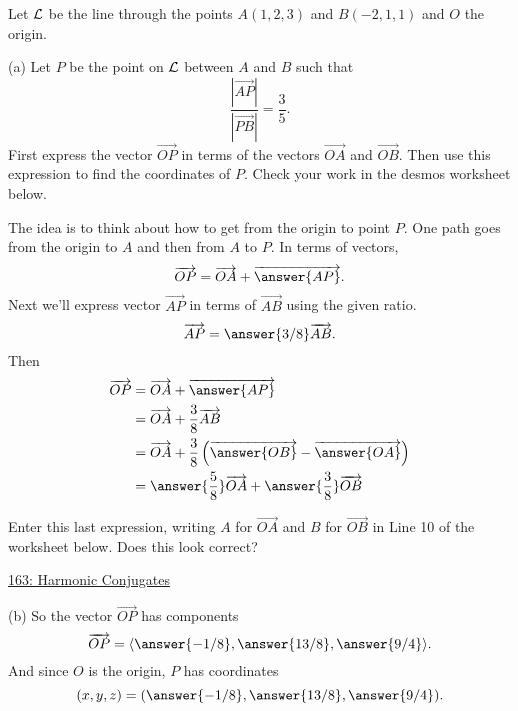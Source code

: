 \documentclass{ximera}
\begin{document}
\begin{question} \label{Q98344422}
Let ${\cal L}$ be the line through the points $A(1,2,3)$ and $B(-2,1,1)$ and $O$ the origin.

(a) Let $P$ be the point on ${\cal L}$ between $A$ and $B$ such that
\[
      \frac{|\overrightarrow{AP}|}{|\overrightarrow{PB}|} = \frac{3}{5} . 
\]
First express the vector $\overrightarrow{OP}$ in terms of the vectors $\overrightarrow{OA}$ and $\overrightarrow{OB}$. Then use this expression to find the coordinates of $P$. Check your work in the desmos worksheet below.

\begin{explanation}
The idea is to think about how to get from the origin to point $P$. One path goes from the origin to $A$ and then from $A$ to $P$. In terms of vectors,
\[
   \overrightarrow{OP} = \overrightarrow{OA} + \overrightarrow{\answer{AP}}.
\]
Next we'll express vector $\overrightarrow{AP}$ in terms of $\overrightarrow{AB}$ using the given ratio.
\[
      \overrightarrow{AP} = \answer{3/8} \overrightarrow{AB} .
\]
Then
\begin{align*}
  \overrightarrow{OP} &= \overrightarrow{OA} + \overrightarrow{\answer{AP}}  \\
                                &= \overrightarrow{OA} + \frac{3}{8} \overrightarrow{AB} \\
                                &= \overrightarrow{OA} + \frac{3}{8} \left( \overrightarrow{\answer{OB}} - \overrightarrow{\answer{OA}}   \right) \\
                                 &= \answer{\frac{5}{8}} \overrightarrow{OA} + \answer{\frac{3}{8}} \overrightarrow{OB}
\end{align*}

\begin{freeResponse}
Enter this last expression, writing $A$ for $\overrightarrow{OA}$ and $B$ for $\overrightarrow{OB}$ in Line 10 of the worksheet below. Does this look correct?
\end{freeResponse}

\begin{onlineOnly}
    \begin{center}
\end{center}
\end{onlineOnly}

\href{https://www.desmos.com/3d/kqq5ktp0jw}{163: Harmonic Conjugates}

(b) So the vector $\overrightarrow{OP}$ has components
\[
    \overrightarrow{OP} = \langle \answer{-1/8} , \answer{13/8} , \answer{9/4}   \rangle .
\]
And since $O$ is the origin, $P$ has coordinates
\[
   (x,y,z) = (\answer{-1/8} , \answer{13/8} , \answer{9/4}) .
\]


\end{explanation}
\end{question}
\end{document}
